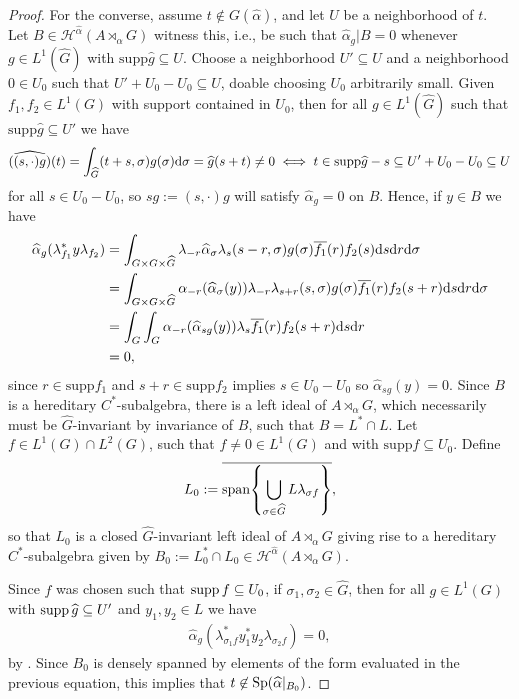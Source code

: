 \begin{proof}
	For the converse, assume $t \not \in G(\hat \alpha)$, and let $U$ be a neighborhood of $t$. Let $B \in \mathscr{H}^{\hat \alpha}(A \rtimes_\alpha G)$ witness this, i.e., be such that $\hat \alpha _g | B = 0$ whenever $g \in L^1(\hat G)$ with $\mathrm{supp} \hat g \subseteq U $. Choose a neighborhood $U' \subseteq U$ and a neighborhood $0 \in U_0$ such that $U' + U_0-U_0 \subseteq U$, doable choosing $U_0$ arbitrarily small. Given $f_1,f_2 \in L^1(G)$ with support contained in $U_0$, then for all $g \in L^1(\hat G)$ such that $\mathrm{supp} \hat g \subseteq U'$ we have
\begin{align}
	\widehat{((s,\cdot)g)}(t) = \int_{\widehat{G}} (t+s, \sigma) g(\sigma) \mathrm{d} \sigma = \widehat{g}(s+t)  \neq 0 \iff t \in \mathrm{supp} \widehat{g} - s \subseteq U'+U_0-U_0 \subseteq U
	\label{L0eq1}
\end{align}
for all $s \in U_0-U_0$, so $sg := (s, \cdot) g$ will satisfy $\hat \alpha_g = 0$ on $B$. Hence, if $y \in B$ we have
\begin{align}
	\widehat{\alpha}_g(\lambda_{f_1}^* y \lambda_{f_2}) &=  \int_{G \times G \times \widehat{G}} \lambda_{-r} \widehat{\alpha}_\sigma \lambda_s (s-r,\sigma) g(\sigma) \overline{f_1}(r) f_2(s) \mathrm{d} s \mathrm{d} r \mathrm{d} \sigma\\
	&=  \int_{G \times G \times \widehat{G}} \alpha_{-r}(\widehat{\alpha}_\sigma(y)) \lambda_{-r} \lambda_{s+r}(s,\sigma) g(\sigma) \overline{f_1}(r) f_2(s+r) \mathrm{d} s \mathrm{d} r \mathrm{d} \sigma\\
	&= \int_{G} \int_G \alpha_{-r}(\widehat{\alpha}_{sg}(y)) \lambda_s \overline{f_1}(r) f_2(s+r) \mathrm{d} s \mathrm{d} r\\
	&= 0,
	\label{L0eq2}
\end{align}
since $r \in \mathrm{supp} f_1$ and $s+r \in \mathrm{supp} f_2$ implies $s \in U_0-U_0$ so $\hat \alpha_{sg}(y) = 0$. Since $B$ is a hereditary $C^*$-subalgebra, there is a left ideal of $A \rtimes_\alpha G$, which necessarily must be $\hat G$-invariant by invariance of $B$, such that $B = L^* \cap L$. Let $f \in L^1(G) \cap L^2(G)$, such that $f \neq 0 \in L^1(G)$ and with $\mathrm{supp} f \subseteq U_0$. Define
\begin{align*}
	L_0 :=	\overline{\mathrm{span} {\left\{\bigcup_{\sigma \in \widehat{G}} L \lambda_{\sigma f}\right\}}},
\end{align*}
so that $L_0$ is a closed $\hat G$-invariant left ideal of $A \rtimes_\alpha G$ giving rise to a hereditary $C^*$-subalgebra given by $B_0:= L_0^* \cap L_0 \in \mathscr H^{\hat \alpha}(A \rtimes_{\alpha}G)$.

Since $f$ was chosen such that $ \operatorname{supp} f \subseteq U_0$, if $\sigma_1,\sigma_2  \in \hat G$, then for all $g \in L^1(G)$ with $\operatorname{supp} \widehat{g} \subseteq U'$ and $y_1,y_2 \in L$ we have
\begin{align*}
	\hat \alpha_g(\lambda_{\sigma_1 f}^* y_1^* y_2 \lambda_{\sigma_2 f}) = 0,
\end{align*}
by . Since $B_0$ is densely spanned by elements of the form evaluated in the previous equation, this implies that $t \not\in \mathrm{Sp}(\widehat{\alpha}|_{B_0})$.


\end{proof}
